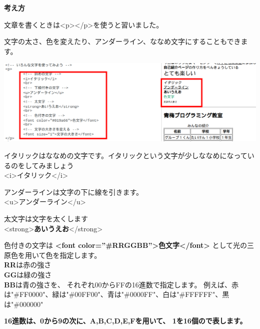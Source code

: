 \documentclass[a4paper,12pt]{jarticle}
\begin{document}
\bigskip

\flushleft
\textbf{考え方}



文章を書くときは{\textless}p{\textgreater}{\textless}/p{\textgreater}を使うと習いました。

文字の太さ、色を変えたり、アンダーライン、ななめ文字にすることもできます。

\centering
\includegraphics[width=14.284cm]{textbook-img186.png}

\bigskip

\flushleft

イタリックはななめの文字です。イタリックという文字が少しななめになっているのをしてみましょう\\
{\textless}i{\textgreater}イタリック{\textless}/i{\textgreater}\\

\bigskip

アンダーラインは文字の下に線を引きます。\\
{\textless}u{\textgreater}アンダーライン{\textless}/u{\textgreater}\\

\bigskip

太文字は文字を太くします\\
{\textless}strong{\textgreater}\textbf{あいうえお}{\textless}/strong{\textgreater}


\bigskip
色付きの文字は
\textbf{{\textless}font color=”\#RRGGBB”{\textgreater}色文字{\textless}/font{\textgreater}}
として光の三原色を用いて色を指定します。\\
\textbf{RR}は赤の強さ\\
\textbf{GG}は緑の強さ\\
\textbf{BB}は青の強さを、
それぞれ00からFFの16進数で指定します。
例えば、赤は"\#FF0000"、緑は"\#00FF00"、青は"\#0000FF"、白は"\#FFFFFF"、黒は"\#000000"

\bigskip
\textbf{16進数は、0から9の次に、A,B,C,D,E,Fを用いて、
  1を16個ので表します。}

\bigskip
\end{document}
